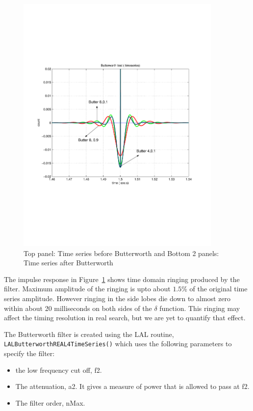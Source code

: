 \begin{figure}[h]
\begin{center}
\includegraphics[width=0.9\textwidth]{figures/butter894comptimeseries}
\caption{Top panel: Time series before Butterworth and 
Bottom 2 panels: Time series after Butterworth} \label{fig:checkbuttertimeseries}
\end{center}
\end{figure}
The impulse response in Figure~\ref{fig:checkbuttertimeseries} shows  
time domain ringing produced by the filter. Maximum amplitude of 
the ringing is upto about $1.5$\% of the original time series amplitude.
However ringing in the side lobes die down to almost zero within about
20 milliseconds on both sides of the $\delta$ function. This ringing may
affect the timing resolution in real search, but we are yet
to quantify that effect.  

The Butterworth filter is created using the LAL routine,
\texttt{LALButterworthREAL4TimeSeries()} which uses the following 
parameters to specify the filter:
\begin{itemize}
  \item the low frequency cut off, f2. 
  \item The attenuation, a2. It gives a measure of power
    that is allowed to pass at f2.
  \item The filter order, nMax.
\end{itemize}

